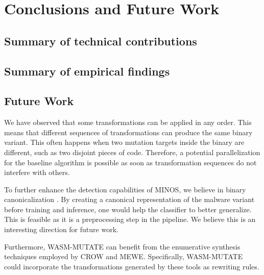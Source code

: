 
\chapter{Conclusions and Future Work}
\label{results}


\section{Summary of technical contributions}




\section{Summary of empirical findings}




\section{Future Work}




We have observed that some transformations can be applied in any order. 
This means that different sequences of transformations can produce the same binary variant. 
This often happens when two mutation targets inside the binary are different, such as two disjoint pieces of code.
Therefore, a potential parallelization for the baseline algorithm is possible as soon as transformation sequences do not interfere with others.


To further enhance the detection capabilities of MINOS, we believe in binary canonicalization \cite{4140990}. By creating a canonical representation of the malware variant before training and inference, one would help the classifier to better generalize. This is feasible as it is a preprocessing step in the pipeline. We believe this is an interesting direction for future work.



Furthermore, WASM-MUTATE can benefit from the enumerative synthesis techniques employed by CROW and MEWE. 
Specifically, WASM-MUTATE could incorporate the transformations generated by these tools as rewriting rules.

